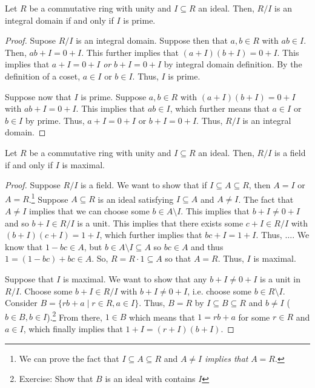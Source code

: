 \documentclass[letterpaper]{article}
\begin{document}
\begin{theorem}{}{}
    Let $R$ be a commutative ring with unity and $I \subseteq R$ an ideal. Then, $R / I$ is an integral domain if and only if $I$ is prime. 
\end{theorem}

\begin{mdframed}[]
    \begin{proof}
        Supose $R / I$ is an integral domain. Suppose then that $a, b \in R$ with $ab \in I$. Then, $ab + I = 0 + I$. This further implies that $(a + I)(b + I) = 0 + I$. This implies that $a + I = 0 + I$ \emph{or} $b + I = 0 + I$ by integral domain definition. By the definition of a coset, $a \in I$ or $b \in I$. Thus, $I$ is prime. 
        
        \bigskip

        Suppose now that $I$ is prime. Suppose $a, b \in R$ with $(a + I)(b + I) = 0 + I$ with $ab + I = 0 + I$. This implies that $ab \in I$, which further means that $a \in I$ or $b \in I$ by prime. Thus, $a + I = 0 + I$ or $b + I = 0 + I$. Thus, $R / I$ is an integral domain.
    \end{proof}
\end{mdframed}

\begin{theorem}{}{}
    Let $R$ be a commutative ring with unity and $I \subseteq R$ an ideal. Then, $R / I$ is a field if and only if $I$ is maximal.
\end{theorem}

\begin{mdframed}[]
    \begin{proof}
        Suppose $R / I$ is a field. We want to show that if $I \subseteq A \subseteq R$, then $A = I$ or $A = R$.\footnote{We can prove the fact that $I \subseteq A \subseteq R$ and $A \neq I$ \emph{implies that} $A = R$.} Suppose $A \subseteq R$ is an ideal satisfying $I \subseteq A$ and $A \neq I$. The fact that $A \neq I$ implies that we can choose some $b \in A \setminus I$. This implies that $b + I \neq 0 + I$ and so $b + I \in R / I$ is a unit. This implies that there exists some $c + I \in R / I$ with $(b + I)(c + I) = 1 + I$, which further implies that $bc + I = 1 + I$. Thus, $\dots$. We know that $1 - bc \in A$, but $b \in A \setminus I \subseteq A$ so $bc \in A$ and thus $1 = (1 - bc) + bc \in A$. So, $R = R \cdot 1 \subseteq A$ so that $A = R$. Thus, $I$ is maximal. 

        \bigskip 

        Suppose that $I$ is maximal. We want to show that any $b + I \neq 0 + I$ is a unit in $R / I$. Choose some $b + I \in R / I$ with $b + I \neq 0 + I$, i.e. choose some $b \in R \setminus I$. Consider $B = \{rb + a \mid r \in R, a \in I\}$. Thus, $B = R$ by $I \subseteq B \subseteq R$ and $b \neq I$ ($b \in B, b \in I$).\footnote{Exercise: Show that $B$ is an ideal with contains $I$} From there, $1 \in B$ which means that $1 = rb + a$ for some $r \in R$ and $a \in I$, which finally implies that $1 + I = (r + I)(b + I)$.
    \end{proof}
\end{mdframed}
\end{document}
